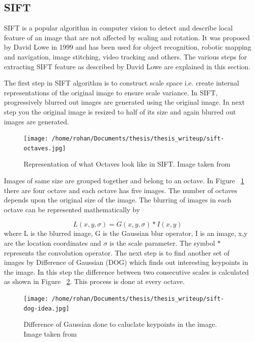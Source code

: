 \documentclass[12pt]{dalcsthesis}
\begin{document}
\subsection{SIFT}
SIFT is a popular algorithm in computer vision to detect and describe local feature of an image that are not affected by scaling and rotation. It was proposed by David Lowe in 1999 \cite{lowe1999object} and has been used for object recognition, robotic mapping and navigation, image stitching, video tracking and others. The various steps for extracting SIFT feature as described by David Lowe are explained in this section.

The first step in SIFT algorithm is to construct scale space i.e. create internal representations of the original image to ensure scale variance. In SIFT, progressively blurred out images are generated using the original image. In next step you the original image is resized to half of its size and again blurred out images are generated. 

\begin{figure}
  \centering
     {\texttt{[image: /home/rohan/Documents/thesis/thesis\_writeup/sift-octaves.jpg]}}
  \caption{\label{fig- sift octaves} Representation of what Octaves look like in SIFT. Image taken from \cite{sift_url}}
\end{figure}

Images of same size are grouped together and belong to an octave. In Figure ~\ref{fig- sift octaves} there are four octave and each octave has five images. The number of octaves depends upon the original size of the image. The blurring of images in each octave can be represented mathematically by 

\begin{equation}
L(x,y,\sigma) = G(x,y,\sigma) * I(x,y)
\end{equation}
where L is the blurred image, G is the Gaussian blur operator, I is an image, x,y are the location coordinates and $\sigma$ is the scale parameter. The symbol $*$ represents the convolution operator.
The next step is to find another set of images by Difference of Gaussian (DOG) which finds out interesting keypoints in the image. In this step the difference between two consecutive scales is calculated as shown in Figure ~\ref{fig- sift dog}. This process is done at every octave. 

\begin{figure}
  \centering
     {\texttt{[image: /home/rohan/Documents/thesis/thesis\_writeup/sift-dog-idea.jpg]}}
  \caption{\label{fig- sift dog} Difference of Gaussian done to caluclate keypoints in the image. Image taken from \cite{sift_url}}
\end{figure}
\end{document}
